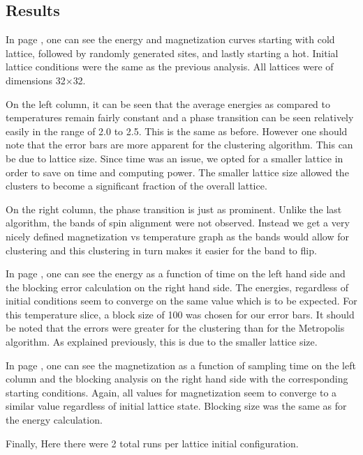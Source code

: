 \documentclass[a4]{scrartcl}
\begin{document}
\subsection{Results}
In page \pageref{CLT}, one can see the energy and magnetization curves starting
with cold lattice, followed by randomly generated sites, and lastly starting a
hot. Initial lattice conditions were the same as the previous analysis. All
lattices were of dimensions 32$\times$32.

On the left column, it can be seen that the average energies as compared to
temperatures remain fairly constant and a phase transition can be seen
relatively easily in the range of 2.0 to 2.5. This is the same as before.
However one should note that the error bars are more apparent for the
clustering algorithm. This can be due to lattice size. Since time was an issue,
we opted for a smaller lattice in order to save on time and computing power.
The smaller lattice size allowed the clusters to become a significant fraction
of the overall lattice.

On the right column, the phase transition is just as prominent. Unlike the last
algorithm, the bands of spin alignment were not observed. Instead we get a very
nicely defined magnetization vs temperature graph as the bands would allow for
clustering and this clustering in turn makes it easier for the band to flip.

In page \pageref{CLE}, one can see the energy as a function of time on the left
hand side and the blocking error calculation on the right hand side. The
energies, regardless of initial conditions seem to converge on the same value
which is to be expected. For this temperature slice, a block size of 100 was
chosen for our error bars. It should be noted that the errors were greater for
the clustering than for the Metropolis algorithm. As explained previously, this
is due to the smaller lattice size.

In page \pageref{CLM}, one can see the magnetization as a function of sampling
time on the left column and the blocking analysis on the right hand side with
the corresponding starting conditions. Again, all values for magnetization seem
to converge to a similar value regardless of initial lattice state. Blocking
size was the same as for the energy calculation.

Finally, Here there were 2 total runs per lattice initial configuration.





\nocite{script}
\nocite{wiki:xxx}
\nocite{Binder:1339249}
\nocite{Onsager:429051}
\nocite{PhysRevLett.60.1591}
\printbibliography
\end{document}
